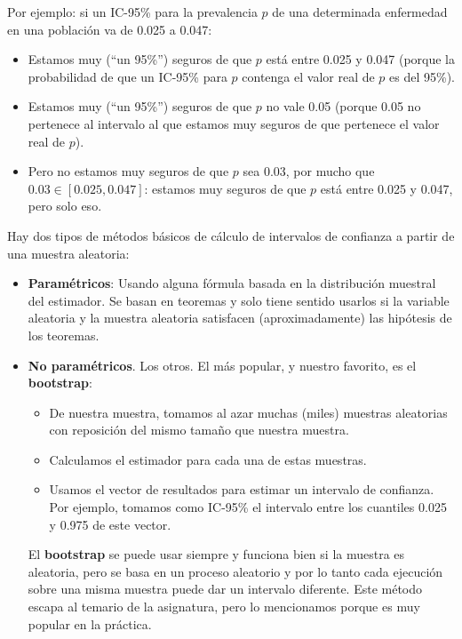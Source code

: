 \documentclass[
  spanish,
  letterpaper,
  DIV=11,
  numbers=noendperiod]{scrreprt}
\providecommand{\tightlist}{%
  \setlength{\itemsep}{0pt}\setlength{\parskip}{0pt}}
\begin{document}
Por ejemplo: si un IC-95\% para la prevalencia \(p\) de una determinada
enfermedad en una población va de 0.025 a 0.047:

\begin{itemize}
\item
  Estamos muy (``un 95\%'') seguros de que \(p\) está entre 0.025 y
  0.047 (porque la probabilidad de que un IC-95\% para \(p\) contenga el
  valor real de \(p\) es del 95\%).
\item
  Estamos muy (``un 95\%'') seguros de que \(p\) no vale 0.05 (porque
  0.05 no pertenece al intervalo al que estamos muy seguros de que
  pertenece el valor real de \(p\)).
\item
  Pero no estamos muy seguros de que \(p\) sea 0.03, por mucho que
  \(0.03\in [0.025,0.047]\): estamos muy seguros de que \(p\) está entre
  0.025 y 0.047, pero solo eso.
\end{itemize}

Hay dos tipos de métodos básicos de cálculo de intervalos de confianza a
partir de una muestra aleatoria:

\begin{itemize}
\item
  \textbf{Paramétricos}: Usando alguna fórmula basada en la distribución
  muestral del estimador. Se basan en teoremas y solo tiene sentido
  usarlos si la variable aleatoria y la muestra aleatoria satisfacen
  (aproximadamente) las hipótesis de los teoremas.
\item
  \textbf{No paramétricos}. Los otros. El más popular, y nuestro
  favorito, es el \textbf{bootstrap}:

  \begin{itemize}
  \tightlist
  \item
    De nuestra muestra, tomamos al azar muchas (miles) muestras
    aleatorias con reposición del mismo tamaño que nuestra muestra.
  \item
    Calculamos el estimador para cada una de estas muestras.
  \item
    Usamos el vector de resultados para estimar un intervalo de
    confianza. Por ejemplo, tomamos como IC-95\% el intervalo entre los
    cuantiles 0.025 y 0.975 de este vector.
  \end{itemize}

  El \textbf{bootstrap} se puede usar siempre y funciona bien si la
  muestra es aleatoria, pero se basa en un proceso aleatorio y por lo
  tanto cada ejecución sobre una misma muestra puede dar un intervalo
  diferente. Este método escapa al temario de la asignatura, pero lo
  mencionamos porque es muy popular en la práctica.
\end{itemize}
\end{document}
